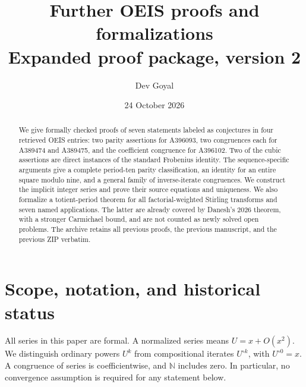 \documentclass[11pt,a4paper]{article}
\title{Further OEIS proofs and formalizations\\\large Expanded proof package, version 2}
\author{Dev Goyal}
\date{24 October 2026}
\theoremstyle{remark}
\newcommand{\N}{\mathbb N}
\begin{document}
\maketitle

\begin{center}
\end{center}

\begin{abstract}
We give formally checked proofs of seven statements labeled as conjectures
in four retrieved OEIS entries: two parity assertions for A396093, two
congruences each for A389474 and A389475, and the coefficient congruence
for A396102. Two of the cubic assertions are direct instances of the
standard Frobenius identity. The sequence-specific arguments give a complete
period-ten parity classification, an identity for an entire square modulo
nine, and a general family of inverse-iterate congruences. We construct the
implicit integer series and prove their source equations and uniqueness.
We also formalize a totient-period theorem for all factorial-weighted
Stirling transforms and seven named applications. The latter are already
covered by Danesh's 2026 theorem, with a stronger Carmichael bound, and
are not counted as newly solved open problems. The archive retains all
previous proofs, the previous manuscript, and the previous ZIP verbatim.
\end{abstract}

\section{Scope, notation, and historical status}

All series in this paper are formal. A normalized series means
$U=x+O(x^2)$. We distinguish ordinary powers $U^k$ from compositional
iterates $U^{\circ k}$, with $U^{\circ0}=x$. A congruence of series is
coefficientwise, and $\N$ includes zero. In particular, no convergence
assumption is required for any statement below.
\end{document}
